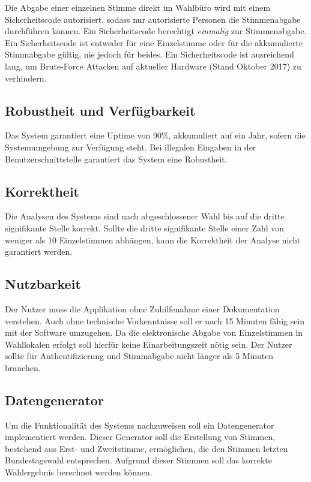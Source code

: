 \documentclass[a4paper]{scrreprt}
\begin{document}
Die Abgabe einer einzelnen Stimme direkt im Wahlbüro wird mit einem Sicherheitscode autorisiert, sodass nur autorisierte Personen die Stimmenabgabe durchführen können.
Ein Sicherheitscode berechtigt \textit{einmalig} zur Stimmenabgabe.
Ein Sicherheitscode ist entweder für eine Einzelstimme oder für die akkumulierte Stimmabgabe gültig, nie jedoch für beides.
Ein Sicherheitscode ist ausreichend lang, um Brute-Force Attacken auf aktueller Hardware (Stand Oktober 2017) zu verhindern.

\subsection{Robustheit und Verfügbarkeit}
Das System garantiert eine Uptime von 90\%, akkumuliert auf ein Jahr, sofern die Systemumgebung zur Verfügung steht.
Bei illegalen Eingaben in der Benutzerschnittstelle garantiert das System eine Robustheit.

\subsection{Korrektheit}
Die Analysen des Systems sind nach abgeschlossener Wahl bis auf die dritte signifikante Stelle korrekt.
Sollte die dritte signifikante Stelle einer Zahl von weniger als 10 Einzelstimmen abhängen, kann die Korrektheit der Analyse nicht garantiert werden.
 
\subsection{Nutzbarkeit}
Der Nutzer muss die Applikation ohne Zuhilfenahme einer Dokumentation verstehen. Auch ohne technische Vorkenntnisse soll er nach 15 Minuten fähig sein mit der Software umzugehen. Da die elektronische Abgabe von Einzelstimmen in Wahllokalen erfolgt soll hierfür keine Einarbeitungszeit nötig sein. Der Nutzer sollte für Authentifizierung und Stimmabgabe nicht länger als 5 Minuten brauchen. 

\subsection{Datengenerator}

Um die Funktionalität des Systems nachzuweisen soll ein Datengenerator implementiert werden. Dieser Generator soll die Erstellung von Stimmen, bestehend aus Erst- und Zweitstimme, ermöglichen, die den Stimmen letzten Bundestagswahl entsprechen. Aufgrund dieser Stimmen soll das korrekte Wahlergebnis berechnet werden können. 
\end{document}
